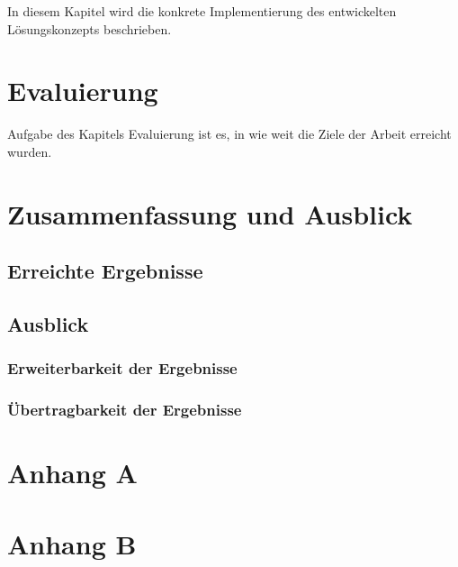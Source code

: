\documentclass[oneside]{ausarbeitung}
\begin{document}
In diesem Kapitel wird die konkrete Implementierung des entwickelten Lösungskonzepts beschrieben.

\chapter{Evaluierung}

Aufgabe des Kapitels Evaluierung ist es, in wie weit die Ziele der Arbeit erreicht wurden.

\chapter{Zusammenfassung und Ausblick}
\label{cha:zusammenfassung}

\section{Erreichte Ergebnisse}
\label{sec:ergebnisse}

\section{Ausblick}
\label{sec:ausblick}

\subsection{Erweiterbarkeit der Ergebnisse}
\label{sub:erweiterbarkeit}

\subsection{Übertragbarkeit der Ergebnisse}
\label{sub:uebertragbarkeit}

\appendix

\printbibliography

\chapter{Anhang A}

\chapter{Anhang B}
\end{document}
